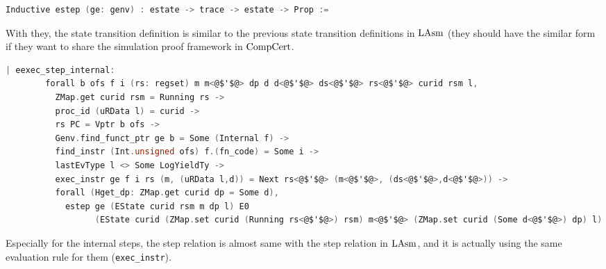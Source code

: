 \begin{lstlisting}[language=C]
  Inductive estep (ge: genv) : estate -> trace -> estate -> Prop :=
\end{lstlisting}

With they, the state transition definition is similar to the previous state transition definitions in $\mathrm{LAsm}$ (they should
 have the similar form if they want to share the simulation proof framework in $\mathrm{CompCert}$.

\begin{lstlisting}[language=C]
    | eexec_step_internal:
        forall b ofs f i (rs: regset) m m<@$'$@> dp d d<@$'$@> ds<@$'$@> rs<@$'$@> curid rsm l,
          ZMap.get curid rsm = Running rs ->
          proc_id (uRData l) = curid ->
          rs PC = Vptr b ofs ->
          Genv.find_funct_ptr ge b = Some (Internal f) ->
          find_instr (Int.unsigned ofs) f.(fn_code) = Some i ->
          lastEvType l <> Some LogYieldTy ->
          exec_instr ge f i rs (m, (uRData l,d)) = Next rs<@$'$@> (m<@$'$@>, (ds<@$'$@>,d<@$'$@>)) ->
          forall (Hget_dp: ZMap.get curid dp = Some d),
            estep ge (EState curid rsm m dp l) E0
                  (EState curid (ZMap.set curid (Running rs<@$'$@>) rsm) m<@$'$@> (ZMap.set curid (Some d<@$'$@>) dp) l)
\end{lstlisting}

Especially for the internal steps, 
the step relation is almost same with the step relation in $\mathrm{LAsm}$, and 
it is actually using the same evaluation rule for them (\lstinline$exec_instr$). 

